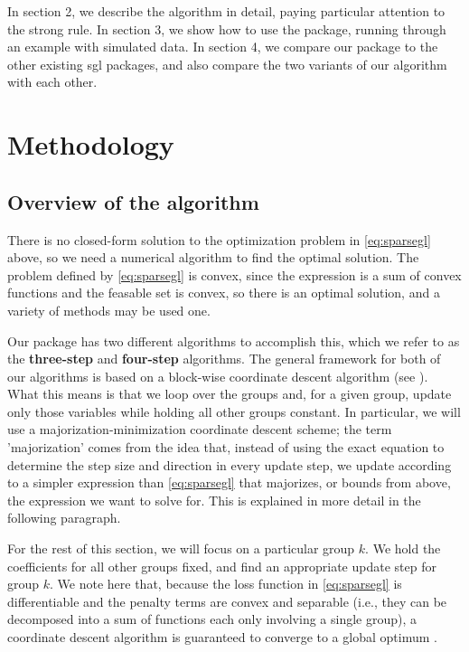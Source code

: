 \documentclass[12pt]{article}
\begin{document}
In section 2, we describe the algorithm in detail, paying particular attention to the strong rule. In section 3, we show how to use the package, running through an example with simulated data. In section 4, we compare our package to the other existing sgl packages, and also compare the two variants of our algorithm with each other.

\section{Methodology}
\label{Sec:meth}

\subsection{Overview of the algorithm}

There is no closed-form solution to the optimization problem in \autoref{eq:sparsegl} above, so we need a numerical algorithm to find the optimal solution. The problem defined by \autoref{eq:sparsegl} is convex, since the expression is a sum of convex functions and the feasable set is convex, so there is an optimal solution, and a variety of methods may be used one.

Our package has two different algorithms to accomplish this, which we refer to as the \textbf{three-step} and \textbf{four-step} algorithms. The general framework for both of our algorithms is based on a block-wise coordinate descent algorithm (see \citep{yang2015fast, simon2013sparse}). What this means is that we loop over the groups and, for a given group, update only those variables while holding all other groups constant. In particular, we will use a majorization-minimization coordinate descent scheme; the term 'majorization' comes from the idea that, instead of using the exact equation to determine the step size and direction in every update step, we update according to a simpler expression than \autoref{eq:sparsegl} that majorizes, or bounds from above, the expression we want to solve for. This is explained in more detail in the following paragraph.

For the rest of this section, we will focus on a particular group $k$. We hold the coefficients for all other groups fixed, and find an appropriate update step for group $k$. We note here that, because the loss function in \autoref{eq:sparsegl} is differentiable and the penalty terms are convex and separable (i.e., they can be decomposed into a sum of functions each only involving a single group), a coordinate descent algorithm is guaranteed to converge to a global optimum \citep{tseng2001convergence}.
\end{document}
